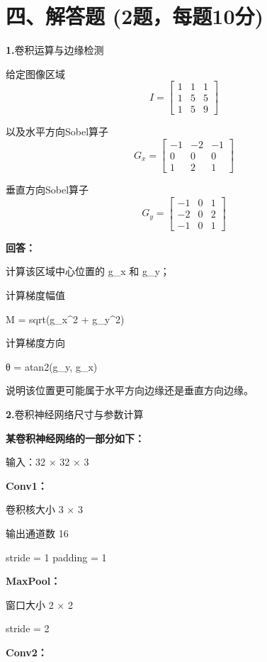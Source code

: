 \documentclass[UTF8,openany,oneside,zihao=-4,fontset=windows]{ctexbook}
\newif\ifshowsolutions
\newcommand{\Question}[2]{%
  \par\Needspace{4\baselineskip}\medskip
  \noindent\textbf{\color{MVBlue}#1}\quad #2\par
}
\newcommand{\PracticeSpace}[1]{\ifshowsolutions\else\par\vspace{#1}\par\fi}
\begin{document}
\section{四、解答题 (2题，每题10分)}
\Question{1.}{卷积运算与边缘检测}
\par 给定图像区域
\[
I = \begin{bmatrix}
1 & 1 & 1 \\
1 & 5 & 5 \\
1 & 5 & 9
\end{bmatrix}
\]
\par 以及水平方向Sobel算子
\[
G_x = \begin{bmatrix}
-1 & -2 & -1 \\
0 & 0 & 0 \\
1 & 2 & 1
\end{bmatrix}
\]
\par 垂直方向Sobel算子
\[
G_y = \begin{bmatrix}
-1 & 0 & 1 \\
-2 & 0 & 2 \\
-1 & 0 & 1
\end{bmatrix}
\]
\par\noindent\textbf{回答：}
\par\noindent\textbullet\quad 计算该区域中心位置的 g\_x 和 g\_y；
\par 计算梯度幅值
\begin{center}\small\ttfamily M = sqrt(g\_x\textasciicircum{}2 + g\_y\textasciicircum{}2)\end{center}
\par 计算梯度方向
\begin{center}\small\ttfamily θ = atan2(g\_y, g\_x)\end{center}
\par 说明该位置更可能属于水平方向边缘还是垂直方向边缘。
\PracticeSpace{4.2cm}
\Question{2.}{卷积神经网络尺寸与参数计算}
\par\noindent\textbf{某卷积神经网络的一部分如下：}
\par 输入：32 × 32 × 3
\par\noindent\textbf{Conv1：}
\par 卷积核大小 3 × 3
\par 输出通道数 16
\begin{center}\small\ttfamily stride = 1 padding = 1\end{center}
\par\noindent\textbf{MaxPool：}
\par 窗口大小 2 × 2
\par stride = 2
\par\noindent\textbf{Conv2：}
\end{document}

